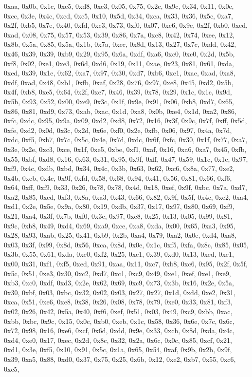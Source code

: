 \documentclass[
]{book}
\begin{document}
0xaa, 0x0b, 0x1c, 0xe5, 0xd8, 0xc3, 0x05, 0x75, 0x2c, 0x9c, 0x34, 0x11, 0x0e, 0xcc, 0x3e, 0x4c, 0xcd, 0xc5, 0x10, 0x5d, 0x34, 0xca, 0x33, 0x36, 0x5c, 0xa7, 0x2f, 0xb5, 0x7e, 0x40, 0xfd, 0xc3, 0x73, 0xf0, 0x07, 0xc6, 0x9e, 0x2f, 0xb0, 0xed, 0xad, 0x08, 0x75, 0x57, 0x53, 0x39, 0x86, 0x7a, 0xe8, 0x42, 0x74, 0xee, 0x12, 0x8b, 0x5a, 0x85, 0x5a, 0x1b, 0x7a, 0xec, 0x8d, 0x13, 0x27, 0x7c, 0xdd, 0x42, 0x46, 0x39, 0x39, 0xb9, 0x29, 0x95, 0x6a, 0xdf, 0xa6, 0xc0, 0xc0, 0x2d, 0x5b, 0xf8, 0x02, 0xe1, 0xe3, 0x6d,
0xd6, 0x19, 0x11, 0xae, 0x23, 0x81, 0x61, 0xda, 0xed, 0x39, 0x1e, 0x62, 0xa7, 0x97, 0x30, 0xd7, 0xb6, 0xe1, 0xae, 0xad, 0xa8, 0xdf, 0xad, 0x48, 0xb1, 0xfb, 0xaf, 0x28, 0x76, 0x97, 0xe8, 0x45, 0xd2, 0x5b, 0x4f, 0xb8, 0xe5, 0x64, 0x2f, 0xe7, 0x46, 0x39, 0x78, 0x29, 0x1c, 0x1c, 0x9d, 0x5b, 0x93, 0x52, 0x00, 0xe9, 0x3c, 0x1f, 0x9e, 0x91, 0x06, 0xb8, 0xd7, 0x65, 0x86, 0x81, 0xd9, 0x73, 0xab, 0xac, 0x1d, 0xa8, 0x0b, 0xe4, 0x1d, 0xa2, 0x86, 0xfc, 0xdc, 0x95, 0x9a, 0x09, 0xd2, 0xd8, 0x72, 0x16, 0x3f, 0x9c,
0x7f, 0xff, 0x5d, 0xfe, 0xd2, 0x0d, 0x3c, 0x2d, 0x6e, 0xf0, 0x2e, 0xfb, 0x06, 0x97, 0x4a, 0x7d, 0xdc, 0xf5, 0xb7, 0x7c, 0x5c, 0x4e, 0x7d, 0xdc, 0x6f, 0xfc, 0x30, 0x1f, 0x77, 0xa7, 0x3e, 0x2e, 0xc3, 0xce, 0x1f, 0xe5, 0xbe, 0xf1, 0xaf, 0x16, 0xa6, 0xa7, 0x45, 0xfb, 0x55, 0xbf, 0xd8, 0x16, 0x63, 0x31, 0x95, 0x9f, 0xff, 0x47, 0x59, 0x1c, 0x1c, 0x97, 0xf9, 0x4c, 0xdb, 0xbd, 0x34, 0x4c, 0x3b, 0x63, 0x62, 0xc6, 0x8a, 0x77, 0xe2, 0x4b, 0xcb, 0x4c, 0x9f, 0xfd, 0x58, 0x68, 0x94, 0x41, 0x56, 0x81, 0x66, 0xf6,
0x64, 0xff, 0xf9, 0x33, 0x26, 0x78, 0x78, 0x4d, 0x18, 0xef, 0x9f, 0xbc, 0x7a, 0xd7, 0xa2, 0x85, 0xed, 0xf3, 0x8a, 0xa3, 0x43, 0x66, 0x82, 0x9f, 0x5f, 0x4c, 0xe2, 0xa4, 0xd1, 0x2e, 0x5e, 0x9a, 0x80, 0x19, 0xdb, 0x37, 0x17, 0x97, 0x80, 0x69, 0xf9, 0x21, 0xa4, 0x3f, 0x7b, 0xf0, 0x3e, 0x97, 0xc8, 0x25, 0x13, 0x05, 0x99, 0x81, 0x9c, 0xb8, 0x49, 0xd4, 0x69, 0xa9, 0xce, 0xa8, 0xda, 0x00, 0x65, 0xa3, 0x95, 0x28, 0x93, 0xab, 0x25, 0x41, 0xb9, 0x2b, 0xa4, 0x79, 0xa2, 0x0e, 0xd4, 0xa8, 0x03, 0x3f, 0x99, 0x8d,
0x56, 0xca, 0x8d, 0x0e, 0x1c, 0xf5, 0xfa, 0x8c, 0x85, 0x05, 0x3b, 0x55, 0x61, 0xda, 0xe0, 0xf2, 0x25, 0xc1, 0x39, 0xd0, 0x13, 0xed, 0xe1, 0x00, 0x31, 0xf1, 0xf5, 0xed, 0x91, 0xaa, 0x11, 0xc7, 0xb8, 0xc6, 0x95, 0x2f, 0x5f, 0x5c, 0x51, 0xe3, 0x30, 0xc2, 0xd7, 0xc1, 0xc9, 0x49, 0xe1, 0xef, 0xe1, 0xe9, 0xb3, 0xc0, 0xdf, 0xd3, 0x2e, 0x62, 0x69, 0xc9, 0x73, 0x3b, 0x16, 0x2e, 0x5a, 0x30, 0xbf, 0x03, 0xbc, 0x32, 0x02, 0x03, 0x27, 0x27, 0x1d, 0xdd, 0xe2, 0x31, 0xca, 0x51, 0xe6, 0xe8, 0x38, 0x26, 0x08, 0x78,
0x79, 0xe0, 0x33, 0x81, 0xf3, 0x02, 0x26, 0x42, 0x5a, 0x40, 0xf6, 0xef, 0x51, 0x03, 0x49, 0xc9, 0xbb, 0xac, 0xbb, 0xbc, 0x9c, 0x15, 0x0c, 0xb0, 0xeb, 0x1c, 0x58, 0x36, 0x6e, 0x7c, 0x6c, 0x72, 0x98, 0x16, 0xe6, 0xcf, 0x6d, 0xdd, 0x9e, 0x33, 0xcb, 0x8d, 0xda, 0x4c, 0xd4, 0xe0, 0x17, 0xec, 0x2d, 0x8c, 0x32, 0x2a, 0x6c, 0x0c, 0x85, 0xcf, 0x21, 0xd1, 0x3e, 0xf5, 0x10, 0x91, 0x5c, 0x1a, 0x65, 0x54, 0xaf, 0x9b, 0x2b, 0x9f, 0x39, 0xa5, 0x88, 0xd0, 0x37, 0x75, 0x25, 0x6b, 0x12, 0xe2, 0xb7, 0x55, 0xc6, 0xc5,
\end{document}
